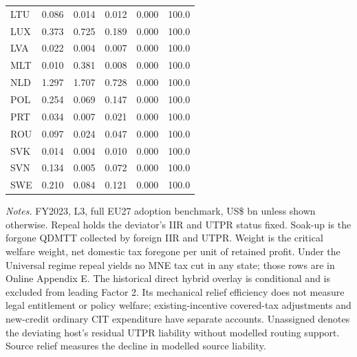 \begin{table}[htbp]
\begin{tabular}{@{}lrrrrr@{}}
LTU & 0.086 & 0.014 & 0.012 & 0.000 & 100.0 \\
LUX & 0.373 & 0.725 & 0.189 & 0.000 & 100.0 \\
LVA & 0.022 & 0.004 & 0.007 & 0.000 & 100.0 \\
MLT & 0.010 & 0.381 & 0.008 & 0.000 & 100.0 \\
NLD & 1.297 & 1.707 & 0.728 & 0.000 & 100.0 \\
POL & 0.254 & 0.069 & 0.147 & 0.000 & 100.0 \\
PRT & 0.034 & 0.007 & 0.021 & 0.000 & 100.0 \\
ROU & 0.097 & 0.024 & 0.047 & 0.000 & 100.0 \\
SVK & 0.014 & 0.004 & 0.010 & 0.000 & 100.0 \\
SVN & 0.134 & 0.005 & 0.072 & 0.000 & 100.0 \\
SWE & 0.210 & 0.084 & 0.121 & 0.000 & 100.0 \\
\bottomrule
\end{tabular}
\par\vspace{0.6em}
\begin{minipage}{\textwidth}\footnotesize\raggedright\textit{Notes.} FY2023, L3, full EU27 adoption benchmark, US\$ bn unless shown otherwise. Repeal holds the deviator's IIR and UTPR status fixed. Soak-up is the forgone QDMTT collected by foreign IIR and UTPR. Weight is the critical welfare weight, net domestic tax foregone per unit of retained profit. Under the Universal regime repeal yields no MNE tax cut in any state; those rows are in Online Appendix E. The historical direct hybrid overlay is conditional and is excluded from leading Factor 2. Its mechanical relief efficiency does not measure legal entitlement or policy welfare; existing-incentive covered-tax adjustments and new-credit ordinary CIT expenditure have separate accounts. Unassigned denotes the deviating host's residual UTPR liability without modelled routing support. Source relief measures the decline in modelled source liability.\end{minipage}
\end{table}
